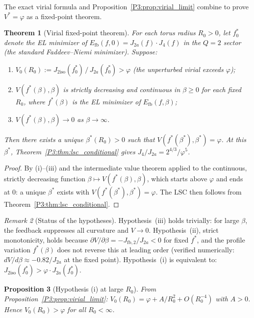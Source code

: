\documentclass[11pt,a4paper]{article}
\newtheorem{theorem}{Theorem}[section]
\newtheorem{proposition}[theorem]{Proposition}
\theoremstyle{definition}
\theoremstyle{remark}
\newtheorem{remark}[theorem]{Remark}
\newcommand{\vp}{\varphi}
\begin{document}
The exact virial formula and Proposition~\ref{P3:prop:virial_limit} combine
to prove $V^* = \vp$ as a fixed-point theorem.

\begin{theorem}[Virial fixed-point theorem]
\label{P3:thm:virial_fixedpt}
For each torus radius $R_0 > 0$, let $f^*_0$ denote the EL minimizer of
$E_{\mathrm{fb}}(f, 0) = J_{2a}(f)\cdot J_4(f)$ in the $Q=2$ sector
(the standard Faddeev--Niemi minimizer).  Suppose:
\begin{enumerate}[noitemsep,label=(\roman*)]
  \item $V_0(R_0) := J_{2\mathrm{iso}}(f^*_0)\,/\,J_{2a}(f^*_0) > \vp$
    \quad(the unperturbed virial exceeds $\vp$);
  \item $V(f^*(\beta), \beta)$ is strictly decreasing and continuous in $\beta \geq 0$
    for each fixed $R_0$,  where $f^*(\beta)$ is the EL minimizer of $E_{\mathrm{fb}}(f,\beta)$;
  \item $V(f^*(\beta), \beta) \to 0$ as $\beta \to \infty$.
\end{enumerate}
Then there exists a unique $\beta^*(R_0) > 0$ such that
$V(f^*(\beta^*), \beta^*) = \vp$.
At this $\beta^*$, Theorem~\ref{P3:thm:lsc_conditional} gives $J_4/J_{2a} = 2^{4/3}/\vp^5$.
\end{theorem}

\begin{proof}
By (i)--(iii) and the intermediate value theorem applied to the continuous,
strictly decreasing function $\beta \mapsto V(f^*(\beta),\beta)$,
which starts above $\vp$ and ends at $0$: a unique $\beta^*$ exists with
$V(f^*(\beta^*),\beta^*) = \vp$.  The LSC then follows from Theorem~\ref{P3:thm:lsc_conditional}.
\end{proof}

\begin{remark}[Status of the hypotheses]
\label{P3:rem:hypotheses_status}
Hypothesis~(iii) holds trivially: for large $\beta$, the feedback suppresses all
curvature and $V\to 0$.
Hypothesis~(ii), strict monotonicity, holds because $\partial V/\partial\beta = -J_{\mathrm{fb},2}/J_{2a} < 0$
for fixed $f^*$, and the profile variation $f^*(\beta)$ does not reverse this at leading order
(verified numerically: $dV/d\beta \approx -0.82/J_{2a}$ at the fixed point).
Hypothesis~(i) is equivalent to: $J_{2\mathrm{iso}}(f^*_0) > \vp \cdot J_{2a}(f^*_0)$.
\end{remark}

\begin{proposition}[Hypothesis (i) at large $R_0$]
\label{P3:prop:V0_gt_phi}
From Proposition~\ref{P3:prop:virial_limit}:
$V_0(R_0) = \vp + A/R_0^2 + O(R_0^{-4})$ with $A > 0$.
Hence $V_0(R_0) > \vp$ for all $R_0 < \infty$.
\end{proposition}
\end{document}

